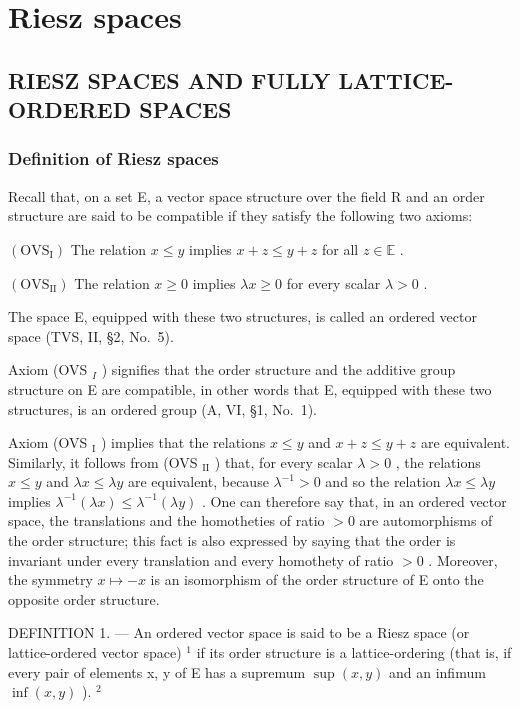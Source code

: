 \chapter{Riesz spaces}

\section{RIESZ SPACES AND FULLY LATTICE-ORDERED SPACES}

\subsection{Definition of Riesz spaces}

Recall that, on a set E, a vector space structure over the field R and an order structure are said to be compatible if they satisfy the following two axioms:

\((\mathrm{OVS}_{\mathrm{I}})\) The relation \(x \leqslant y\) implies \(x + z \leqslant y + z\) for all \(z \in \mathbb{E}\) .

\((\mathrm{OVS}_{\mathrm{II}})\) The relation \(x \geqslant 0\) implies \(\lambda x \geqslant 0\) for every scalar \(\lambda > 0\) .

The space E, equipped with these two structures, is called an ordered vector space (TVS, II, §2, No.~5).

Axiom (OVS \(_{I}\) ) signifies that the order structure and the additive group structure on E are compatible, in other words that E, equipped with these two structures, is an ordered group (A, VI, §1, No.~1).

Axiom (OVS \(_{\text{I}}\) ) implies that the relations \(x \leqslant y\) and \(x + z \leqslant y + z\) are equivalent. Similarly, it follows from (OVS \(_{\text{II}}\) ) that, for every scalar \(\lambda > 0\) , the relations \(x \leqslant y\) and \(\lambda x \leqslant \lambda y\) are equivalent, because \(\lambda^{-1} > 0\) and so the relation \(\lambda x \leqslant \lambda y\) implies \(\lambda^{-1}(\lambda x) \leqslant \lambda^{-1}(\lambda y)\) . One can therefore say that, in an ordered vector space, the translations and the homotheties of ratio \(> 0\) are automorphisms of the order structure; this fact is also expressed by saying that the order is invariant under every translation and every homothety of ratio \(> 0\) . Moreover, the symmetry \(x \mapsto -x\) is an isomorphism of the order structure of E onto the opposite order structure.

DEFINITION 1. --- An ordered vector space is said to be a Riesz space (or lattice-ordered vector space) \(^{1}\) if its order structure is a lattice-ordering (that is, if every pair of elements x, y of E has a supremum \(\sup(x,y)\) and an infimum \(\inf(x,y)\) ). \(^{2}\)

